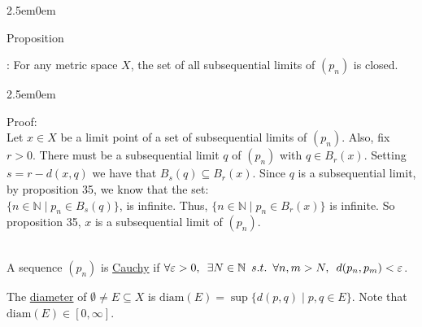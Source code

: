 \documentclass{book}
\newcommand{\hThree}{%
   \color{PineGreen}
   \fontsize{13}{15}\selectfont%
}
\newenvironment{myIndent}{%
   \begin{adjustwidth}{2.5em}{0em}%
}{%
   \end{adjustwidth}%
}
\newcommand{\udefine}[1]{%
   \setulcolor{Red}%
   \setul{0.14em}{0.07em}%
   \ul{#1}%
}
\newcommand{\retTwo}{\hfill\bigbreak}
\newcommand{\suchthat}{ \hspace{0.5em}s.t.\hspace{0.5em}}
\newcommand{\myHS}{ \hspace{0.5em}}
\newcommand{\diam}[1]{\mathrm{diam}(#1)}
\newcounter{PropNumber}
\newcommand{\propCount}[1][1]{%
   \addtocounter{PropNumber}{#1}%
   \thePropNumber%
}
\newcommand{\mySepTwo}[1][.]{%
   {\noindent\color{#1}{\rule{6.5in}{0.5mm}}}\\%
}
\begin{document}
{\begin{myIndent}
      Proposition \propCount: For any metric space $X$, the set of all subsequential limits of $(p_n)$ is closed.
      {\begin{myIndent} \hThree
         Proof:\\
         Let $x \in X$ be a limit point of a set of subsequential limits of $(p_n)$. Also, fix $r > 0$. There must be a subsequential limit $q$ of $(p_n)$ with $q \in B_r(x)$. Setting $s = r - d(x, q)$ we have that $B_s(q) \subseteq B_r(x)$.
         \retTwo
         Since $q$ is a subsequential limit, by proposition 35, we know that the set:\\ $\{n \in \mathbb{N} \mid p_n \in B_s(q)\}$, is infinite. Thus, $\{n \in \mathbb{N} \mid p_n \in B_r(x)\}$ is infinite. So proposition 35, $x$ is a subsequential limit of $(p_n)$.
         \retTwo
      \end{myIndent}}
   \end{myIndent}}

   \mySepTwo

   A sequence $(p_n)$ is \udefine{Cauchy} if $\forall \varepsilon > 0, \myHS \exists N \in \mathbb{N} \suchthat \forall n,m > N, \myHS d(p_n, p_m) < \varepsilon$. \retTwo

   The \udefine{diameter} of $\emptyset \neq E \subseteq X$ is $\diam{E} = \sup{\{d(p, q) \mid p,q \in E\}}$. Note that $\diam{E} \in [0, \infty]$. \retTwo
   
\end{document}
